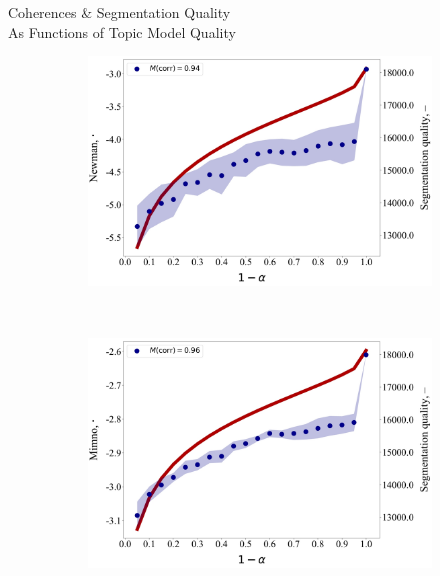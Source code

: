 \documentclass[russian]{beamer}
\begin{document}
\begin{frame}{Coherences \& Segmentation Quality\\ As Functions of Topic Model Quality}
  
  \begin{figure}[h]
    \begin{subfigure}[t]{0.48\textwidth}
      \includegraphics[width=\linewidth]{newman-iteration.jpg}
    \end{subfigure}
    ~
    \begin{subfigure}[t]{0.48\textwidth}
      \includegraphics[width=\linewidth]{mimno-iteration.jpg}
    \end{subfigure}
    \begin{subfigure}[t]{0.48\textwidth}

\end{subfigure}
\end{figure}
\end{frame}
\end{document}
